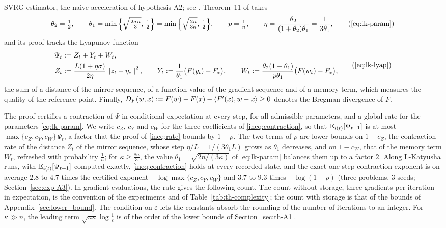 SVRG estimator, the naive acceleration of hypothesis A2; see . Theorem~11
of \cite{kovalev2020dont} takes
\begin{equation*}
\theta_2=\tfrac12,\qquad \theta_1=\min\Big\{\sqrt{\tfrac{2\sigma n}{3}},\,\tfrac12\Big\}=\min\Big\{\sqrt{\tfrac{2n}{3\kappa}},\,\tfrac12\Big\},\qquad p=\tfrac1n,\qquad \eta=\frac{\theta_2}{(1+\theta_2)\theta_1}=\frac1{3\theta_1},\tag{\ref*{eq:lk-param}}
\end{equation*}
and its proof tracks the Lyapunov function
\begin{equation*}
\begin{aligned}
\Psi_t &:= Z_t+Y_t+W_t,\\
Z_t&:=\frac{L(1+\eta\sigma)}{2\eta}\norm{z_t-\etastar}^2,\qquad Y_t:=\frac1{\theta_1}\big(F(y_t)-F_\ast\big),\qquad W_t:=\frac{\theta_2(1+\theta_1)}{p\theta_1}\big(F(w_t)-F_\ast\big),
\end{aligned}\tag{\ref*{eq:lk-lyap}}
\end{equation*}
the sum of a distance of the mirror sequence, of a function value of the gradient sequence and of a memory term, which
measures the quality of the reference point. Finally, $D_F(w,x):=F(w)-F(x)-\left\langle F'(x), w-x \right\rangle\ge0$ denotes the Bregman
divergence of $F$.

The proof certifies a contraction of $\Psi$ in conditional expectation at every step, for all admissible parameters,
and a global rate for the parameters \eqref{eq:lk-param}.
We write $c_Z$, $c_Y$ and $c_W$ for the three coefficients of \eqref{ineq:contraction}, so that $\mathbb{E}_{i(t)}[\Psi_{t+1}]$ is
at most $\max\{c_Z,c_Y,c_W\}\,\Psi_t$, a factor that the proof of \eqref{ineq:rate} bounds by $1-\rho$. The two
terms of $\rho$ are lower bounds on $1-c_Z$, the contraction rate of the distance $Z_t$ of the mirror sequence, whose
step $\eta/L=1/(3\theta_1L)$ grows as $\theta_1$ decreases, and on $1-c_W$, that of the memory term $W_t$, refreshed with
probability $\frac1n$; for $\kappa\ge\frac{8n}3$, the value $\theta_1=\sqrt{2n/(3\kappa)}$ of \eqref{eq:lk-param} balances
them up to a factor $2$. Along L-Katyusha runs, with
$\mathbb{E}_{i(t)}[\Psi_{t+1}]$ computed exactly, \eqref{ineq:contraction} holds at every recorded state, and the exact one-step
contraction exponent is on average $2.8$ to $4.7$ times the certified exponent $-\log\max\{c_Z,c_Y,c_W\}$ and $3.7$ to
$9.3$ times $-\log(1-\rho)$ (three problems, 3 seeds; Section~\ref{sec:exp-A3}). In gradient evaluations, the rate gives
the following count.
The count without storage, three gradients per iteration in expectation, is the convention of the experiments and of
Table~\ref{tab:th-complexity}; the count with storage is that of the bounds of Appendix~\ref{sec:lower_bound}. The
condition on $\varepsilon$ lets the constants absorb the rounding of the number of iterations to an integer. For
$\kappa\gg n$, the leading term $\sqrt{n\kappa}\log\frac1\varepsilon$ is of the order of the lower bounds of
Section~\ref{sec:th-A1}.

